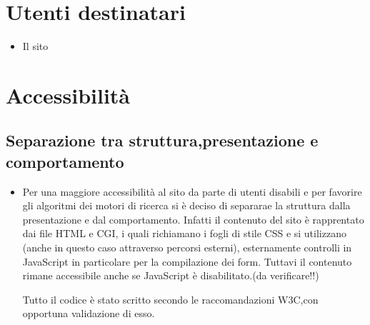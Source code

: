 \documentclass[12pt]{article}
\begin{document}
		\section{Utenti destinatari}
		\begin{itemize}
			\item Il sito 
		\end{itemize}
		\section{Accessibilit\`a}
		\subsection{Separazione tra struttura,presentazione e comportamento}
		\begin{itemize}
			\item Per una maggiore accessibilità al sito da parte di utenti disabili e per favorire gli algoritmi dei motori di ricerca si è deciso di separarae la struttura dalla presentazione e dal comportamento.
			Infatti il contenuto del sito è rapprentato dai file HTML e CGI, i quali richiamano i fogli di stile CSS e si utilizzano (anche in questo caso attraverso percorsi esterni), esternamente controlli in JavaScript in particolare per la compilazione dei form. Tuttavi il contenuto rimane accessibile anche se JavaScript è disabilitato.(da verificare!!)
			
			Tutto il codice è stato scritto secondo le raccomandazioni W3C,con opportuna validazione di esso.
		\end{itemize}
\end{document}

